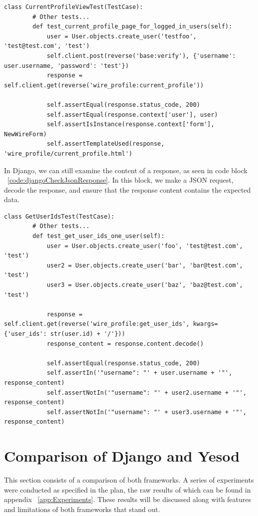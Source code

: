\begin{lstlisting}[caption={Django current profile test},label={code:djangoCurrentProfileTest}]
	class CurrentProfileViewTest(TestCase):
		# Other tests...
		def test_current_profile_page_for_logged_in_users(self):
			user = User.objects.create_user('testfoo', 'test@test.com', 'test')
			self.client.post(reverse('base:verify'), {'username': user.username, 'password': 'test'})
			response = self.client.get(reverse('wire_profile:current_profile'))

			self.assertEqual(response.status_code, 200)
			self.assertEqual(response.context['user'], user)
			self.assertIsInstance(response.context['form'], NewWireForm)
			self.assertTemplateUsed(response, 'wire_profile/current_profile.html')
\end{lstlisting}

In Django, we can still examine the content of a response, as seen in code block ~\ref{code:djangoCheckJsonResponse}.
In this block, we make a JSON request, decode the response, and ensure that the response
content contains the expected data.

\begin{lstlisting}[caption={Django checking a JSON response test},label={code:djangoCheckJsonResponse}]
	class GetUserIdsTest(TestCase):
		# Other tests...
		def test_get_user_ids_one_user(self):
			user = User.objects.create_user('foo', 'test@test.com', 'test')
			user2 = User.objects.create_user('bar', 'bar@test.com', 'test')
			user3 = User.objects.create_user('baz', 'baz@test.com', 'test')

			response = self.client.get(reverse('wire_profile:get_user_ids', kwargs={'user_ids': str(user.id) + '/'}))
			response_content = response.content.decode()

			self.assertEqual(response.status_code, 200)
			self.assertIn('"username": "' + user.username + '"', response_content)
			self.assertNotIn('"username": "' + user2.username + '"', response_content)
			self.assertNotIn('"username": "' + user3.username + '"', response_content)
\end{lstlisting}

\section{Comparison of Django and Yesod}

This section consists of a comparison of both frameworks. A series of experiments
were conducted as specified in the plan, the raw results of which can be found
in appendix ~\ref{app:Experiments}. These results will be discussed along with
features and limitations of both frameworks that stand out.

